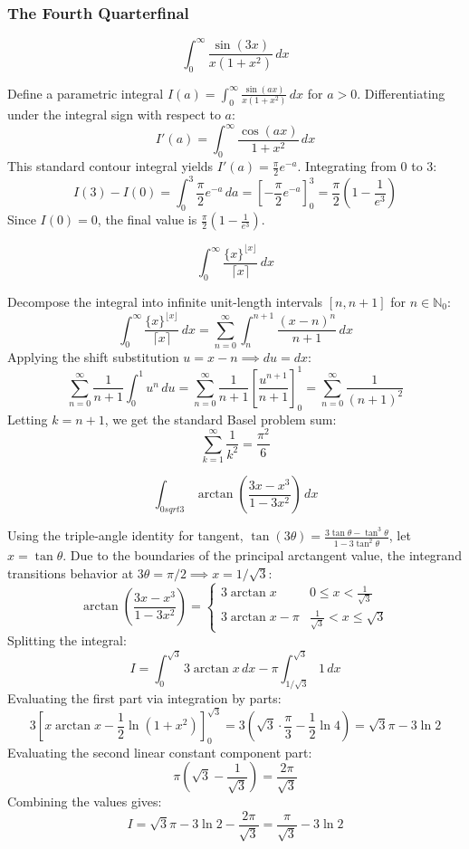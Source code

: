 \subsubsection*{The Fourth Quarterfinal}
\begin{questions}
\question 
\[ \int_{0}^{\infty} \frac{\sin(3x)}{x(1 + x^2)} \, dx \]
\begin{solution}
Define a parametric integral $I(a) = \int_{0}^{\infty} \frac{\sin(ax)}{x(1+x^2)} \, dx$ for $a > 0$. Differentiating under the integral sign with respect to $a$:
\[ I'(a) = \int_{0}^{\infty} \frac{\cos(ax)}{1+x^2} \, dx \]
This standard contour integral yields $I'(a) = \frac{\pi}{2}e^{-a}$. Integrating from $0$ to $3$:
\[ I(3) - I(0) = \int_{0}^{3} \frac{\pi}{2}e^{-a} \, da = \left[ -\frac{\pi}{2}e^{-a} \right]_{0}^{3} = \frac{\pi}{2}\left(1 - \frac{1}{e^3}\right) \]
Since $I(0) = 0$, the final value is $\frac{\pi}{2}\left(1 - \frac{1}{e^3}\right)$.
\end{solution}

\question 
\[ \int_{0}^{\infty} \frac{\{x\}^{\lfloor x\rfloor}}{\lceil x\rceil} \, dx \]
\begin{solution}
Decompose the integral into infinite unit-length intervals $[n, n+1]$ for $n \in \mathbb{N}_0$:
\[ \int_{0}^{\infty} \frac{\{x\}^{\lfloor x\rfloor}}{\lceil x\rceil} \, dx = \sum_{n=0}^{\infty} \int_{n}^{n+1} \frac{(x-n)^n}{n+1} \, dx \]
Applying the shift substitution $u = x - n \implies du = dx$:
\[ \sum_{n=0}^{\infty} \frac{1}{n+1} \int_{0}^{1} u^n \, du = \sum_{n=0}^{\infty} \frac{1}{n+1} \left[ \frac{u^{n+1}}{n+1} \right]_{0}^{1} = \sum_{n=0}^{\infty} \frac{1}{(n+1)^2} \]
Letting $k = n + 1$, we get the standard Basel problem sum:
\[ \sum_{k=1}^{\infty} \frac{1}{k^2} = \frac{\pi^2}{6} \]
\end{solution}

\question 
\[ \int_{0sqrt{3}} \arctan\left(\frac{3x - x^3}{1 - 3x^2}\right) \, dx \]
\begin{solution}
Using the triple-angle identity for tangent, $\tan(3\theta) = \frac{3\tan\theta - \tan^3\theta}{1 - 3\tan^2\theta}$, let $x = \tan\theta$. Due to the boundaries of the principal arctangent value, the integrand transitions behavior at $3\theta = \pi/2 \implies x = 1/\sqrt{3}$:
\[ \arctan\left(\frac{3x - x^3}{1 - 3x^2}\right) = \begin{cases} 3\arctan x & 0 \le x < \frac{1}{\sqrt{3}} \\ 3\arctan x - \pi & \frac{1}{\sqrt{3}} < x \le \sqrt{3} \end{cases} \]
Splitting the integral:
\[ I = \int_{0}^{\sqrt{3}} 3\arctan x \, dx - \pi\int_{1/\sqrt{3}}^{\sqrt{3}} 1 \, dx \]
Evaluating the first part via integration by parts:
\[ 3 \left[ x\arctan x - \frac{1}{2}\ln(1+x^2) \right]_{0}^{\sqrt{3}} = 3\left(\sqrt{3}\cdot\frac{\pi}{3} - \frac{1}{2}\ln 4\right) = \sqrt{3}\pi - 3\ln 2 \]
Evaluating the second linear constant component part:
\[ \pi\left(\sqrt{3} - \frac{1}{\sqrt{3}}\right) = \frac{2\pi}{\sqrt{3}} \]
Combining the values gives:
\[ I = \sqrt{3}\pi - 3\ln 2 - \frac{2\pi}{\sqrt{3}} = \frac{\pi}{\sqrt{3}} - 3\ln 2 \]
\end{solution}
\end{questions}

